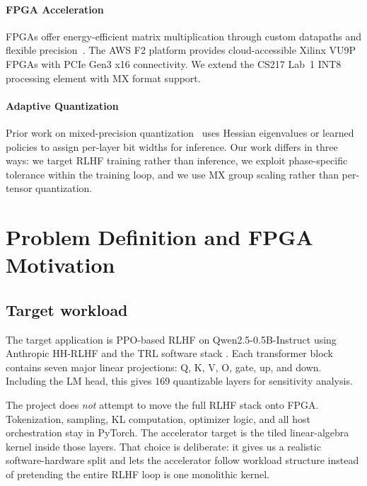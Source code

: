 \documentclass[11pt,a4paper]{article}
\begin{document}
\paragraph{FPGA Acceleration}
FPGAs offer energy-efficient matrix multiplication through custom datapaths and flexible precision~\citep{guo2017angel, wang2021fpga}.
The AWS F2 platform provides cloud-accessible Xilinx VU9P FPGAs with PCIe Gen3 x16 connectivity.
We extend the CS217 Lab~1 INT8 processing element with MX format support.

\paragraph{Adaptive Quantization}
Prior work on mixed-precision quantization~\citep{dong2019hawq, wang2019haq} uses Hessian eigenvalues or learned policies to assign per-layer bit widths for inference.
Our work differs in three ways: we target RLHF training rather than inference, we exploit phase-specific tolerance within the training loop, and we use MX group scaling rather than per-tensor quantization.


\section{Problem Definition and FPGA Motivation}

\subsection{Target workload}

The target application is PPO-based RLHF on Qwen2.5-0.5B-Instruct \citep{qwen2025qwen25} using Anthropic HH-RLHF \citep{bai2022training} and the TRL software stack \citep{vonwerra2022trl}. Each transformer block contains seven major linear projections: Q, K, V, O, gate, up, and down. Including the LM head, this gives 169 quantizable layers for sensitivity analysis.

The project does \emph{not} attempt to move the full RLHF stack onto FPGA. Tokenization, sampling, KL computation, optimizer logic, and all host orchestration stay in PyTorch. The accelerator target is the tiled linear-algebra kernel inside those layers. That choice is deliberate: it gives us a realistic software-hardware split and lets the accelerator follow workload structure instead of pretending the entire RLHF loop is one monolithic kernel.
\end{document}
